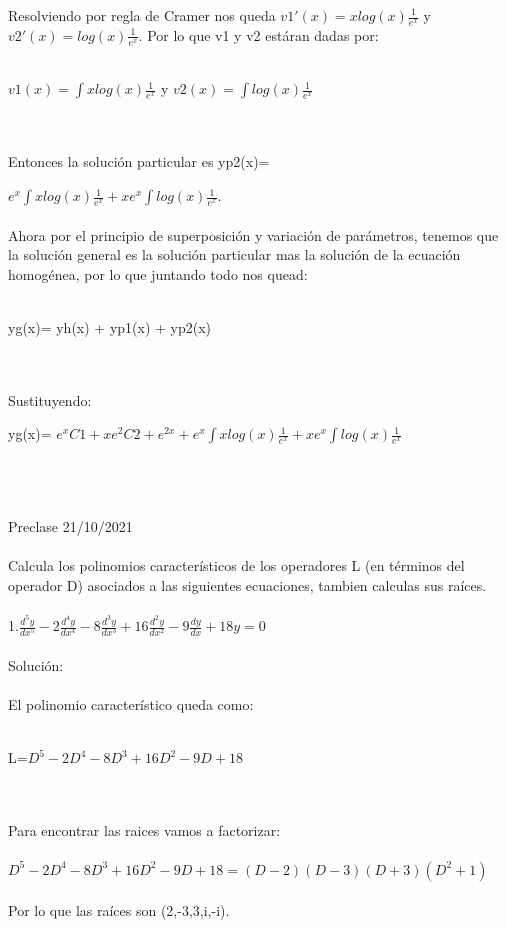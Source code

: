 \documentclass[a4paper,10pt]{article}
\begin{document}
Resolviendo por regla de Cramer nos queda $v1'(x)=xlog(x)\frac{1}{e^x}$ y $v2'(x)=log(x)\frac{1}{e^x}$. Por lo que v1 y v2 estáran dadas por:\\\\
\centerline{$v1(x)=\int xlog(x)\frac{1}{e^x}$ y $v2(x)=\int log(x)\frac{1}{e^x}$}\\\\
Entonces la solución particular es yp2(x)={$e^x \int xlog(x)\frac{1}{e^x} +xe^x \int log(x)\frac{1}{e^x}$.\\\\
Ahora por el principio de superposición y variación de parámetros, tenemos que la solución general es la solución particular mas la solución de la ecuación homogénea, por lo que juntando todo nos quead:\\\\
\centerline{yg(x)= yh(x) + yp1(x) + yp2(x)}\\\\
Sustituyendo:\\
\centerline{yg(x)= $e^x C1 + xe^2 C2 + e^{2x} + e^x \int xlog(x)\frac{1}{e^x} +xe^x \int log(x)\frac{1}{e^x}$}\\\\\\
Preclase 21/10/2021\\\\
Calcula los polinomios característicos de los operadores L (en
términos del operador D) asociados a las siguientes ecuaciones,
tambien calculas sus raíces.\\\\
1.$\frac{d^5 y }{dx^5} - 2\frac{d^4  y}{dx^4}   - 8\frac{d^3 y}{dx^3}  + 16\frac{d^2 y}{dx^2} - 9\frac{dy}{dx}  + 18y =0$\\\\
Solución:\\\\
El polinomio característico queda como:\\\\
\centerline{L=$D^5 - 2D^4 - 8D^3 + 16D^2 - 9D + 18$}\\\\
Para encontrar las raices vamos a factorizar:\\\\
$D^5 - 2D^4 - 8D^3 + 16D^2 - 9D + 18 = (D-2)(D-3)(D+3)(D^2 + 1)$\\\\
Por lo que las raíces son (2,-3,3,i,-i).\\\\\\
}
\end{document}
